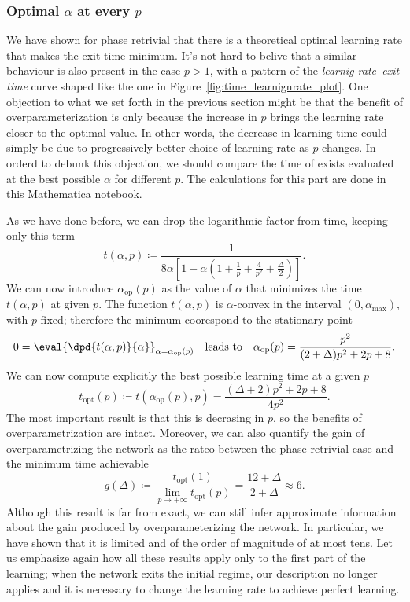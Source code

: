\subsubsection{Optimal $\alpha$ at every $p$}
We have shown for phase retrivial that there is a theoretical optimal learning rate that makes the exit time minimum.
It's not hard to belive that a similar behaviour is also present in the case \(p>1\),
with a pattern of the \emph{learnig rate--exit time} curve shaped like the one in Figure~\ref{fig:time_learnignrate_plot}.
One objection to what we set forth in the previous section might be that the benefit of overparameterization is only because the increase in \(p\) brings the learning rate closer to the optimal value.
In other words, the decrease in learning time could simply be due to progressively better choice of learning rate as \(p\) changes.
In orderd to debunk this objection, we should compare the time of exists evaluated at the best possible \(\alpha\) for different \(p\).
The calculations for this part are done in this Mathematica notebook.

As we have done before, we can drop the logarithmic factor from time, keeping only this term
\[
  t{(\alpha,p)} \coloneqq \frac{1}{8\alpha\left[1- \alpha\left(1+\frac{1}{p}+\frac{4}{p^2}+\frac{\Delta}{2}\right)\right]}.
\]
We can now introduce \(\alpha_\text{op}(p)\) as the value of \(\alpha\) that minimizes the time \(t{(\alpha,p)}\) at given \(p\). 
The function \(t{(\alpha,p)}\) is \(\alpha\)-convex in the interval \((0,\alpha_\text{max})\), with \(p\) fixed;
therefore the minimum coorespond to the stationary point
\[
  0 = \eval{\dpd{t{(\alpha,p)}}{\alpha}}_{\alpha = \alpha_\text{op}(p)} \quad\text{leads to}\quad 
  \alpha_\text{op}(p) = \frac{p^2}{(2+\Delta)p^2+2 p+8}.
\]
We can now compute explicitly the best possible learning time at a given \(p\)
\[
  t_\text{opt}{(p)} \coloneqq t{\left(\alpha_\text{op}(p),p\right)} = \frac{(\Delta +2) p^2+2p+8}{4 p^2}.
\]
The most important result is that this is decrasing in \(p\), so the benefits of overparametrization are intact.
Moreover, we can also quantify the gain of overparametrizing the network as the rateo between the phase retrivial case
and the minimum time achievable
\[
  g{(\Delta)} \coloneqq \frac{t_\text{opt}{(1)}}{\lim_{p\to+\infty}t_\text{opt}{(p)}} = \frac{12+\Delta}{2+\Delta} \approx 6.
\]
Although this result is far from exact, we can still infer approximate information about the gain produced by overparameterizing the network.
In particular, we have shown that it is limited and of the order of magnitude of at most tens.
Let us emphasize again how all these results apply only to the first part of the learning;
when the network exits the initial regime, our description no longer applies and it is necessary to change the learning rate to achieve perfect learning.


